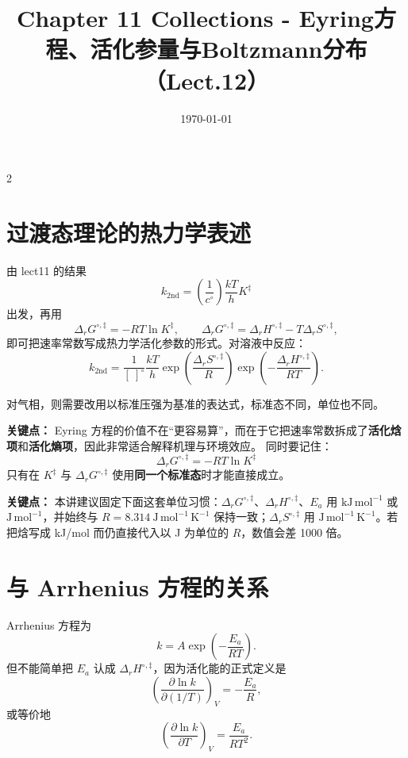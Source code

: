 \documentclass[a4paper,9pt]{article}
\title{\vspace{-2em}\Large\bfseries\color{sectioncolor} Chapter 11 Collections - Eyring方程、活化参量与Boltzmann分布（Lect.12）\vspace{-1em}}
\author{}
\date{\today}
\newenvironment{keypoint}
{\par\vspace{0.3em}\noindent\begin{tcolorbox}[colback=keybg,colframe=keycolor,boxrule=0.5pt,arc=2pt,left=2pt,right=2pt,top=2pt,bottom=2pt,boxsep=0pt]\noindent\textcolor{keycolor}{\textbf{关键点：}}}
{\end{tcolorbox}\par\vspace{0.3em}}
\begin{document}
\maketitle
\thispagestyle{fancy}

\begin{multicols}{2}
\scriptsize{\tableofcontents}

\section{过渡态理论的热力学表述}

由 lect11 的结果
\[
k_{2\mathrm{nd}}=\left(\frac{1}{c^\circ}\right)\frac{kT}{h}K^{\ddagger}
\]
出发，再用
\[
\Delta_rG^{\circ,\ddagger}=-RT\ln K^{\ddagger},
\qquad
\Delta_rG^{\circ,\ddagger}=\Delta_rH^{\circ,\ddagger}-T\Delta_rS^{\circ,\ddagger},
\]
即可把速率常数写成热力学活化参数的形式。对溶液中反应：
\[
k_{2\mathrm{nd}}=\frac{1}{[\ ]^\circ}\frac{kT}{h}
\exp\left(\frac{\Delta_rS^{\circ,\ddagger}}{R}\right)
\exp\left(-\frac{\Delta_rH^{\circ,\ddagger}}{RT}\right).
\]

对气相，则需要改用以标准压强为基准的表达式，标准态不同，单位也不同。

\begin{keypoint}
Eyring 方程的价值不在“更容易算”，而在于它把速率常数拆成了\textbf{活化焓项}和\textbf{活化熵项}，因此非常适合解释机理与环境效应。
同时要记住：
\[
\Delta_rG^{\circ,\ddagger}=-RT\ln K^{\ddagger}
\]
只有在 $K^{\ddagger}$ 与 $\Delta_rG^{\circ,\ddagger}$ 使用\textbf{同一个标准态}时才能直接成立。
\end{keypoint}

\begin{keypoint}
	本讲建议固定下面这套单位习惯：$\Delta_rG^{\circ,\ddagger}$、$\Delta_rH^{\circ,\ddagger}$、$E_a$ 用 $\mathrm{kJ\,mol^{-1}}$ 或 $\mathrm{J\,mol^{-1}}$，并始终与 $R=8.314\ \mathrm{J\,mol^{-1}\,K^{-1}}$ 保持一致；$\Delta_rS^{\circ,\ddagger}$ 用 $\mathrm{J\,mol^{-1}\,K^{-1}}$。若把焓写成 kJ/mol 而仍直接代入以 J 为单位的 $R$，数值会差 1000 倍。
\end{keypoint}

\section{与 Arrhenius 方程的关系}

Arrhenius 方程为
\[
k=A\exp\left(-\frac{E_a}{RT}\right).
\]
但不能简单把 $E_a$ 认成 $\Delta_rH^{\circ,\ddagger}$，因为活化能的正式定义是
\[
\left(\frac{\partial \ln k}{\partial (1/T)}\right)_V=-\frac{E_a}{R},
\]
或等价地
\[
\left(\frac{\partial \ln k}{\partial T}\right)_V=\frac{E_a}{RT^2}.
\]


\end{multicols}
\end{document}
